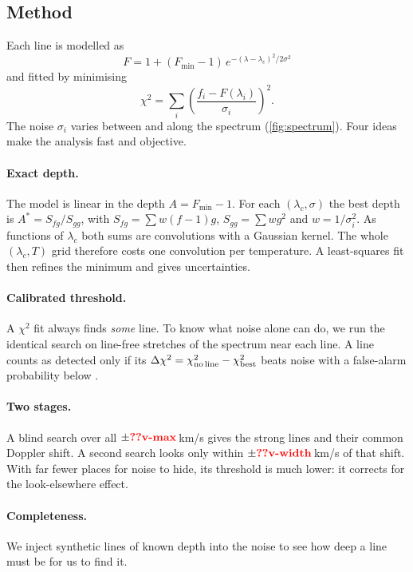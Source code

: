 \documentclass[aps,prd,twocolumn,nofootinbib,floatfix,superscriptaddress]{revtex4-2}
\begin{document}
\subsection{Method}
Each line is modelled as
\begin{equation}
  F=1+(F_{\min}-1)\,e^{-(\lambda-\lambda_c)^2/2\sigma^2}
\end{equation}
and fitted by minimising
\begin{equation}
  \chi^2=\sum_i\left(\frac{f_i-F(\lambda_i)}{\sigma_i}\right)^2.
\end{equation}
The noise $\sigma_i$ varies between  and  along the spectrum (\cref{fig:spectrum}).
Four ideas make the analysis fast and objective.

\paragraph{Exact depth.}
The model is linear in the depth $A=F_{\min}-1$.
For each $(\lambda_c,\sigma)$ the best depth is $A^*=S_{fg}/S_{gg}$, with $S_{fg}=\sum w(f-1)g$, $S_{gg}=\sum wg^2$ and $w=1/\sigma_i^2$.
As functions of $\lambda_c$ both sums are convolutions with a Gaussian kernel.
The whole $(\lambda_c,T)$ grid therefore costs one convolution per temperature.
A least-squares fit then refines the minimum and gives uncertainties.

\paragraph{Calibrated threshold.}
A $\chi^2$ fit always finds \emph{some} line.
To know what noise alone can do, we run the identical search on  line-free stretches of the spectrum near each line.
A line counts as detected only if its $\Delta\chi^2=\chi^2_{\rm no\,line}-\chi^2_{\rm best}$ beats noise with a false-alarm probability below .

\paragraph{Two stages.}
A blind search over all $\pm\val{v-max}$\,km/s gives the strong lines and their common Doppler shift.
A second search looks only within $\pm\val{v-width}$\,km/s of that shift.
With far fewer places for noise to hide, its threshold is much lower: it corrects for the look-elsewhere effect.

\paragraph{Completeness.}
We inject synthetic lines of known depth into the noise to see how deep a line must be for us to find it.
\end{document}
